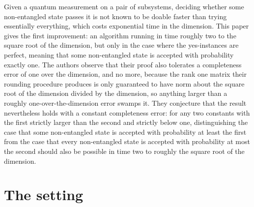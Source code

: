 \documentclass{aicr-conjecture}
\begin{document}

\vspace{0.4em}

\begin{informalconjecture}
Given a quantum measurement on a pair of subsystems, deciding whether
some non-entangled state passes it is not known to be doable faster than
trying essentially everything, which costs exponential time in the
dimension. This paper gives the first improvement: an algorithm running
in time roughly two to the square root of the dimension, but only in the
case where the yes-instances are perfect, meaning that some
non-entangled state is accepted with probability exactly one. The
authors observe that their proof also tolerates a completeness error of
one over the dimension, and no more, because the rank one matrix their
rounding procedure produces is only guaranteed to have norm about the
square root of the dimension divided by the dimension, so anything
larger than a roughly one-over-the-dimension error swamps it. They
conjecture that the result nevertheless holds with a constant
completeness error: for any two constants with the first strictly larger
than the second and strictly below one, distinguishing the case that
some non-entangled state is accepted with probability at least the first
from the case that every non-entangled state is accepted with
probability at most the second should also be possible in time two to
roughly the square root of the dimension.
\end{informalconjecture}

\section{The setting}\label{sec:setting}
\end{document}
